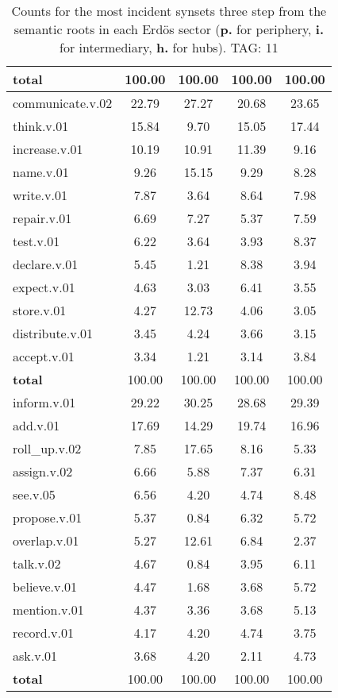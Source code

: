 \begin{table}[h!]
\begin{center}
\begin{tabular}{| l || c | c | c | c |}
{{\bf total}} & 100.00  & 100.00  & 100.00  & 100.00 \\\hline\hline\hline
communicate.v.02 & 22.79  & 27.27  & 20.68  & 23.65 \\\hline
think.v.01 & 15.84  & 9.70  & 15.05  & 17.44 \\\hline
increase.v.01 & 10.19  & 10.91  & 11.39  & 9.16 \\\hline
name.v.01 & 9.26  & 15.15  & 9.29  & 8.28 \\\hline
write.v.01 & 7.87  & 3.64  & 8.64  & 7.98 \\\hline
repair.v.01 & 6.69  & 7.27  & 5.37  & 7.59 \\\hline
test.v.01 & 6.22  & 3.64  & 3.93  & 8.37 \\\hline
declare.v.01 & 5.45  & 1.21  & 8.38  & 3.94 \\\hline
expect.v.01 & 4.63  & 3.03  & 6.41  & 3.55 \\\hline
store.v.01 & 4.27  & 12.73  & 4.06  & 3.05 \\\hline
distribute.v.01 & 3.45  & 4.24  & 3.66  & 3.15 \\\hline
accept.v.01 & 3.34  & 1.21  & 3.14  & 3.84 \\\hline\hline
{{\bf total}} & 100.00  & 100.00  & 100.00  & 100.00 \\\hline\hline\hline
inform.v.01 & 29.22  & 30.25  & 28.68  & 29.39 \\\hline
add.v.01 & 17.69  & 14.29  & 19.74  & 16.96 \\\hline
roll\_up.v.02 & 7.85  & 17.65  & 8.16  & 5.33 \\\hline
assign.v.02 & 6.66  & 5.88  & 7.37  & 6.31 \\\hline
see.v.05 & 6.56  & 4.20  & 4.74  & 8.48 \\\hline
propose.v.01 & 5.37  & 0.84  & 6.32  & 5.72 \\\hline
overlap.v.01 & 5.27  & 12.61  & 6.84  & 2.37 \\\hline
talk.v.02 & 4.67  & 0.84  & 3.95  & 6.11 \\\hline
believe.v.01 & 4.47  & 1.68  & 3.68  & 5.72 \\\hline
mention.v.01 & 4.37  & 3.36  & 3.68  & 5.13 \\\hline
record.v.01 & 4.17  & 4.20  & 4.74  & 3.75 \\\hline
ask.v.01 & 3.68  & 4.20  & 2.11  & 4.73 \\\hline\hline
{{\bf total}} & 100.00  & 100.00  & 100.00  & 100.00 \\\hline
\end{tabular}
\caption{Counts for the most incident synsets three step from the semantic roots in each Erd\"os sector ({\bf p.} for periphery, {\bf i.} for intermediary, {\bf h.} for hubs). TAG: 11}
\end{center}
\end{table}